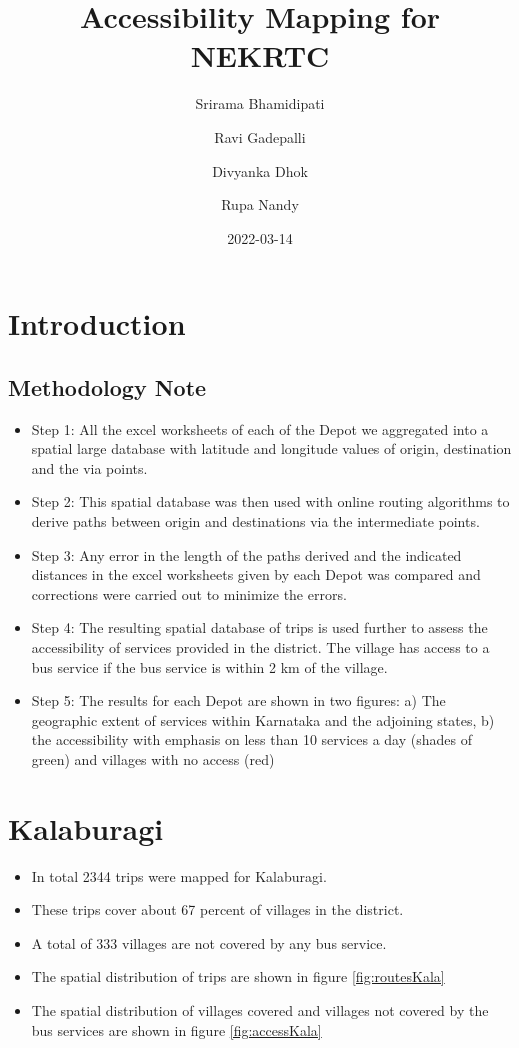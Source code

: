 \documentclass[
]{book}
\title{Accessibility Mapping for NEKRTC}
\author{Srirama Bhamidipati \and Ravi Gadepalli \and Divyanka Dhok \and Rupa Nandy}
\date{2022-03-14}
\providecommand{\tightlist}{%
  \setlength{\itemsep}{0pt}\setlength{\parskip}{0pt}}
\begin{document}
\maketitle

{
\setcounter{tocdepth}{1}
\tableofcontents
}
\hypertarget{introduction}{%
\chapter{Introduction}\label{introduction}}

\hypertarget{methodology-note}{%
\section{Methodology Note}\label{methodology-note}}

\begin{itemize}
\item
  Step 1: All the excel worksheets of each of the Depot we aggregated into a spatial large database with latitude and longitude values of origin, destination and the via points.
\item
  Step 2: This spatial database was then used with online routing algorithms to derive paths between origin and destinations via the intermediate points.
\item
  Step 3: Any error in the length of the paths derived and the indicated distances in the excel worksheets given by each Depot was compared and corrections were carried out to minimize the errors.
\item
  Step 4: The resulting spatial database of trips is used further to assess the accessibility of services provided in the district. The village has access to a bus service if the bus service is within 2 km of the village.
\item
  Step 5: The results for each Depot are shown in two figures: a) The geographic extent of services within Karnataka and the adjoining states, b) the accessibility with emphasis on less than 10 services a day (shades of green) and villages with no access (red)
\end{itemize}

\hypertarget{kalaburagi}{%
\chapter{Kalaburagi}\label{kalaburagi}}

\begin{itemize}
\tightlist
\item
  In total 2344 trips were mapped for Kalaburagi.
\item
  These trips cover about 67 percent of villages in the district.
\item
  A total of 333 villages are not covered by any bus service.
\item
  The spatial distribution of trips are shown in figure \ref{fig:routesKala}
\item
  The spatial distribution of villages covered and villages not covered by the bus services are shown in figure \ref{fig:accessKala}
\end{itemize}
\end{document}
